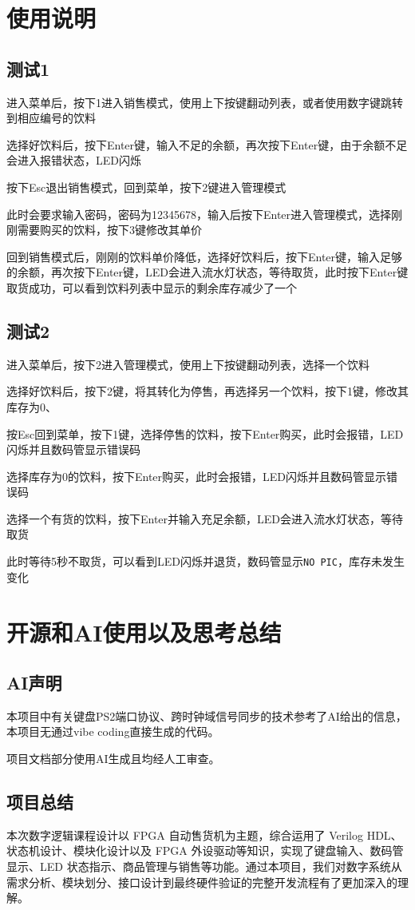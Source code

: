 \documentclass{article}
\begin{document}
\section{使用说明}
\label{sec:instruction}
\subsection{测试1}
	进入菜单后，按下1进入销售模式，使用上下按键翻动列表，或者使用数字键跳转到相应编号的饮料

	选择好饮料后，按下Enter键，输入不足的余额，再次按下Enter键，由于余额不足会进入报错状态，LED闪烁
	
	按下Esc退出销售模式，回到菜单，按下2键进入管理模式
	
	此时会要求输入密码，密码为12345678，输入后按下Enter进入管理模式，选择刚刚需要购买的饮料，按下3键修改其单价
	
	回到销售模式后，刚刚的饮料单价降低，选择好饮料后，按下Enter键，输入足够的余额，再次按下Enter键，LED会进入流水灯状态，等待取货，此时按下Enter键取货成功，可以看到饮料列表中显示的剩余库存减少了一个
\subsection{测试2}
	进入菜单后，按下2进入管理模式，使用上下按键翻动列表，选择一个饮料
	
	选择好饮料后，按下2键，将其转化为停售，再选择另一个饮料，按下1键，修改其库存为0、
	
	按Esc回到菜单，按下1键，选择停售的饮料，按下Enter购买，此时会报错，LED闪烁并且数码管显示错误码
	
	选择库存为0的饮料，按下Enter购买，此时会报错，LED闪烁并且数码管显示错误码
	
	选择一个有货的饮料，按下Enter并输入充足余额，LED会进入流水灯状态，等待取货
	
	此时等待5秒不取货，可以看到LED闪烁并退货，数码管显示\texttt{NO PIC}，库存未发生变化
	
\section{开源和AI使用以及思考总结}
\label{sec:conclusion}
\subsection{AI声明}
本项目中有关键盘PS2端口协议、跨时钟域信号同步的技术参考了AI给出的信息，本项目无通过vibe coding直接生成的代码。

项目文档部分使用AI生成且均经人工审查。
\subsection{项目总结}
本次数字逻辑课程设计以 FPGA 自动售货机为主题，综合运用了 Verilog HDL、状态机设计、模块化设计以及 FPGA 外设驱动等知识，实现了键盘输入、数码管显示、LED 状态指示、商品管理与销售等功能。通过本项目，我们对数字系统从需求分析、模块划分、接口设计到最终硬件验证的完整开发流程有了更加深入的理解。
\end{document}
